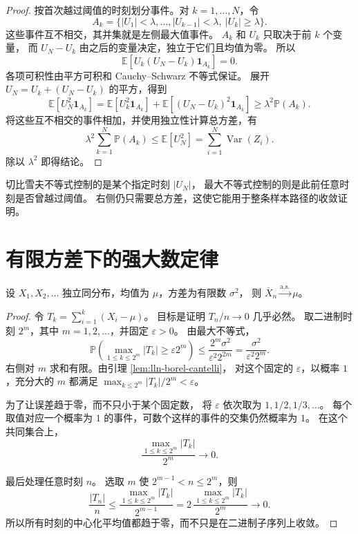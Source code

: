 \documentclass[UTF8,12pt,a4paper,fontset=fandol]{ctexart}
\begin{document}
\begin{proof}
按首次越过阈值的时刻划分事件。对 $k=1,\ldots,N$，令
\[
  A_k=\{|U_1|<\lambda,\ldots,|U_{k-1}|<\lambda,\ |U_k|\geq\lambda\}.
\]
这些事件互不相交，其并集就是左侧最大值事件。
$A_k$ 和 $U_k$ 只取决于前 $k$ 个变量，
而 $U_N-U_k$ 由之后的变量决定，独立于它们且均值为零。
所以
\[
  \mathbb E[U_k(U_N-U_k)\mathbf1_{A_k}]=0.
\]
各项可积性由平方可积和 Cauchy--Schwarz 不等式保证。
展开 $U_N=U_k+(U_N-U_k)$ 的平方，得到
\[
  \mathbb E[U_N^2\mathbf1_{A_k}]
  =\mathbb E[U_k^2\mathbf1_{A_k}]
   +\mathbb E[(U_N-U_k)^2\mathbf1_{A_k}]
  \geq\lambda^2\mathbb P(A_k).
\]
将这些互不相交的事件相加，并使用独立性计算总方差，有
\[
  \lambda^2\sum_{k=1}^N\mathbb P(A_k)
  \leq\mathbb E[U_N^2]
  =\sum_{i=1}^N\operatorname{Var}(Z_i).
\]
除以 $\lambda^2$ 即得结论。
\end{proof}

切比雪夫不等式控制的是某个指定时刻 $|U_N|$，
最大不等式控制的则是此前任意时刻是否曾越过阈值。
右侧仍只需要总方差，这使它能用于整条样本路径的收敛证明。

\section{有限方差下的强大数定律}
\label{sec:lln-strong-finite}

\begin{theorem}[有限方差的强大数定律]
\label{thm:lln-slln-finite}
设 $X_1,X_2,\ldots$ 独立同分布，均值为 $\mu$，方差为有限数 $\sigma^2$，
则 $\overline X_n\xrightarrow{\mathrm{a.s.}}\mu$。
\end{theorem}

\begin{proof}
令 $T_k=\sum_{i=1}^k(X_i-\mu)$。
目标是证明 $T_n/n\to0$ 几乎必然。
取二进制时刻 $2^m$，其中 $m=1,2,\ldots$，并固定 $\varepsilon>0$。
由最大不等式，
\begin{equation}
  \mathbb P\left(
    \max_{1\leq k\leq2^m}|T_k|\geq\varepsilon2^m
  \right)
  \leq\frac{2^m\sigma^2}{\varepsilon^2 2^{2m}}
  =\frac{\sigma^2}{\varepsilon^2 2^m}.
  \label{eq:lln-dyadic-bound}
\end{equation}
右侧对 $m$ 求和有限。由引理 \ref{lem:lln-borel-cantelli}，
对这个固定的 $\varepsilon$，以概率 $1$，充分大的 $m$ 都满足
$\max_{k\leq2^m}|T_k|/2^m<\varepsilon$。

为了让误差趋于零，而不只小于某个固定数，
将 $\varepsilon$ 依次取为 $1,1/2,1/3,\ldots$。
每个取值对应一个概率为 $1$ 的事件，可数个这样的事件的交集仍然概率为 $1$。
在这个共同集合上，
\begin{equation}
  \frac{\max_{1\leq k\leq2^m}|T_k|}{2^m}\longrightarrow0.
  \label{eq:lln-dyadic-convergence}
\end{equation}

最后处理任意时刻 $n$。
选取 $m$ 使 $2^{m-1}<n\leq2^m$，则
\[
  \frac{|T_n|}{n}
  \leq\frac{\max_{1\leq k\leq2^m}|T_k|}{2^{m-1}}
  =2\,\frac{\max_{1\leq k\leq2^m}|T_k|}{2^m}
  \longrightarrow0.
\]
所以所有时刻的中心化平均值都趋于零，而不只是在二进制子序列上收敛。
\end{proof}
\end{document}
